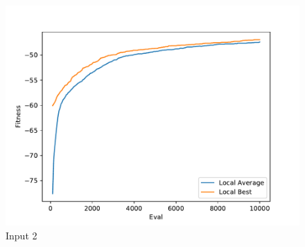 \documentclass{standalone}
\begin{document}
\begin{figure}[!htb]
	\caption{Input 2}
	\label{fig:graph_2002}
	\includegraphics[width=\textwidth]{../graphs/graphs/2002.pdf}
\end{figure}
\end{document}
